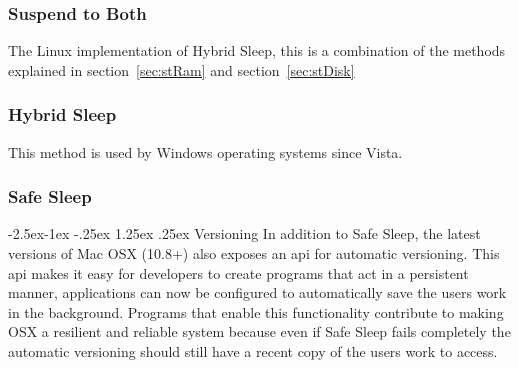 \documentclass[a4,12pt]{article}
\makeatletter
\renewcommand\paragraph{\@startsection{paragraph}{4}{\z@}%
{-2.5ex\@plus -1ex \@minus -.25ex}%
{1.25ex \@plus .25ex}%
{\normalfont\normalsize\bfseries}}
\makeatother
\begin{document}
\subsubsection{Suspend to Both}\label{sec:stBoth}
The Linux implementation of Hybrid Sleep, this is a combination of the methods explained in section~\ref{sec:stRam} and section~\ref{sec:stDisk}
\subsubsection{Hybrid Sleep}\label{sec:hybridsleep}
This method is used by Windows operating systems since Vista.
\subsubsection{Safe Sleep}\label{sec:safesleep}
\paragraph{Versioning}
In addition to Safe Sleep, the latest versions of Mac OSX (10.8+) also exposes an api for automatic versioning. This api makes it easy for developers to create programs that act in a persistent manner, applications can now be configured to automatically save the users work in the background. 
Programs that enable this functionality contribute to making OSX a resilient and reliable system because even if Safe Sleep fails completely the automatic versioning should still have a recent copy of the users work to access.
\end{document}
